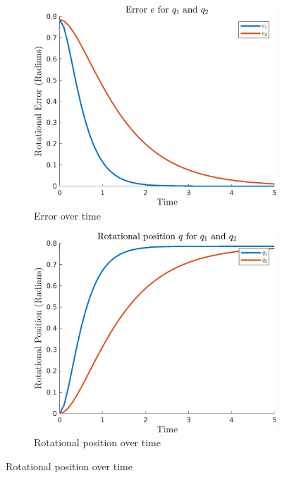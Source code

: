\documentclass{article}
\begin{document}
\begin{figure}[H]
    \centering
    \begin{subfigure}{0.325\textwidth}
        \centering
        \includegraphics[width = \textwidth]{figures/error-c3.png}
        \caption{Error over time}
    \end{subfigure}
    \begin{subfigure}{0.325\textwidth}
        \centering
        \includegraphics[width = \textwidth]{figures/rotational-position-c3.png}
        \caption{Rotational position over time}
    \end{subfigure}

\end{figure}
\end{document}
